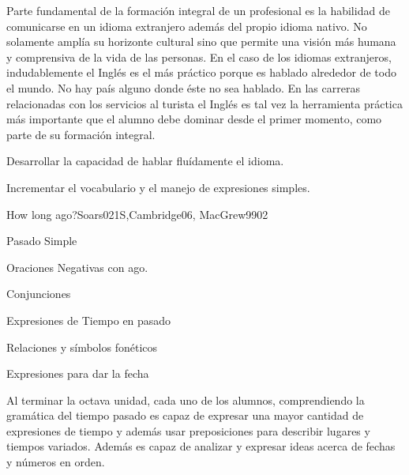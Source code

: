 \begin{syllabus}


\begin{justification}
Parte fundamental de la formación integral de un profesional es la habilidad de 
comunicarse en un idioma extranjero además del propio idioma nativo. No solamente 
amplía su horizonte cultural sino que permite una visión más humana y comprensiva 
de la vida de las personas. En el caso de los idiomas extranjeros, indudablemente 
el Inglés es el más práctico porque es hablado alrededor de todo el mundo. No hay 
país alguno donde éste no sea hablado. En las carreras relacionadas con los 
servicios al turista el Inglés es tal vez la herramienta práctica más importante 
que el alumno debe dominar desde el primer momento, como parte de su formación 
integral.
\end{justification}

\begin{goals}
    \item Desarrollar la capacidad de hablar fluídamente el idioma.
    \item Incrementar el vocabulario y el manejo de expresiones simples.
\end{goals}

\begin{outcomes}
    \item {}
\end{outcomes}

\begin{competences}
    \item {}
\end{competences}

\begin{unit}{How long ago?}{}{Soars021S,Cambridge06, MacGrew99}{0}{2}
   \begin{topics}
      \item Pasado Simple
      \item Oraciones Negativas con ago.
      \item Conjunciones
      \item Expresiones de Tiempo en pasado
      \item Relaciones y sí­mbolos fonéticos
      \item Expresiones para dar la fecha
   \end{topics}

   \begin{learningoutcomes}
      \item Al terminar la octava unidad, cada uno de los alumnos, comprendiendo la gramática del tiempo pasado es capaz de expresar una mayor cantidad de expresiones de tiempo y además usar preposiciones para describir lugares y tiempos variados. Además es capaz de analizar y expresar ideas acerca de fechas y números en orden. 
   \end{learningoutcomes}


\end{unit}
\end{syllabus}
